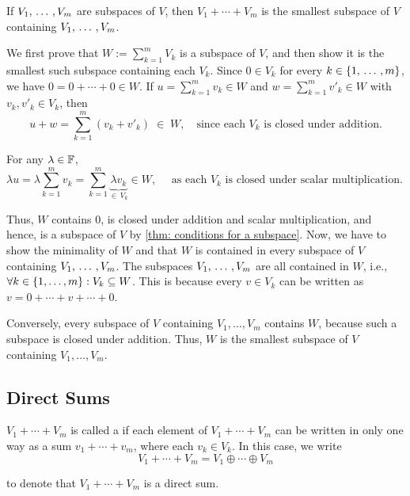 \setcounter{thm}{39}
\begin{thm} 
  \label{thm: sum of subspaces is the smallest containing subspace}
  If $V_1, {\, \ldots \,\,}, V_m$ are subspaces of $V$, then $V_1 + \cdots + V_m$ is the smallest subspace of $V$ containing $V_1, {\, \ldots \,\,} , V_m$.
\end{thm}
\begin{prf}
  We first prove that $W := \sum_{k=1}^m V_k$ is a subspace of $V$,
  and then show it is the smallest such subspace
  containing each $V_k$.
  Since $0 \in V_k$ for every $k \in \{1, {\, \ldots \,\,}, m\}$, we have $0 = 0 + \cdots + 0 \in W$.
  If
  \(u = \sum_{k=1}^m v_k \in W\) and
  \(w = \sum_{k=1}^m v'_k \in W\)
  with \(v_k, v'_k\in V_k\), then
  \[
    \textstyle
    u + w = \sum_{k=1}^m (v_k + v'_k)\;\in\;W, \quad \text{since each \(V_k\) is closed under addition.}
  \]


  For any $\lambda \in \mathbb{F}$,
  \begin{equation}
      \textstyle
      \lambda u = \lambda \sum_{k=1}^m v_k =  \sum_{k=1}^m \underbrace{\lambda v_k}_{\in \, V_k}  \in W,
      \quad \text{ as each \(V_k\) is closed under scalar multiplication. }
  \end{equation}

  Thus, $W$ contains $0$, is closed under addition and scalar multiplication, and hence, is a subspace of $V$ by \ref{thm: conditions for a subspace}.
  Now, we have to show the minimality of $W$ and that $W$ is contained in every subspace of $V$ containing $V_1, {\, \ldots \,\,}, V_m$.
  The subspaces $V_1, {\, \ldots \,\,}, V_m$ are all contained in $W$, i.e., $\forall k \in \{1, \dots, m \}: V_k \subseteq W$. This is because every $v \in V_k$ can be written as $v = 0 + \cdots + v + \cdots + 0$.

  Conversely, every subspace of $V$ containing $V_1, \ldots, V_m$ contains $W$, because such a subspace is closed under addition. Thus, $W$ is the smallest subspace of $V$ containing $V_1, \ldots, V_m$.
\end{prf}

\subsection{Direct Sums}

\setcounter{thm}{40}
\begin{mydef}
  \label{def: direct sum}
  $V_1 + \cdots + V_m$ is called a  if each element of $V_1 +\cdots+V_m$ can be written in only one way as a sum $v_1 + \cdots + v_m$, where each $v_k \in V_k$. In this case, we write
  \begin{equation}
     V_1 + \cdots + V_m = V_1 \oplus \cdots \oplus V_m
  \end{equation}

  to denote that $V_1 + \cdots + V_m$ is a direct sum.
\end{mydef}

